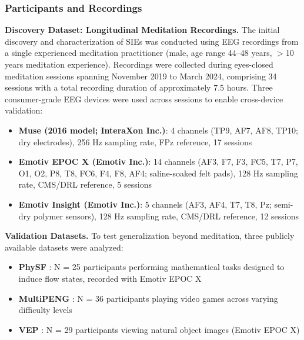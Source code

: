 \documentclass[11pt,a4paper]{article}
\begin{document}
\subsubsection{Participants and Recordings}

\textbf{Discovery Dataset: Longitudinal Meditation Recordings.}
The initial discovery and characterization of SIEs was conducted using EEG recordings from a single experienced meditation practitioner (male, age range 44--48 years, $>$10 years meditation experience). Recordings were collected during eyes-closed meditation sessions spanning November 2019 to March 2024, comprising 34 sessions with a total recording duration of approximately 7.5 hours. Three consumer-grade EEG devices were used across sessions to enable cross-device validation:

\begin{itemize}
    \item \textbf{Muse (2016 model; InteraXon Inc.)}: 4 channels (TP9, AF7, AF8, TP10; dry electrodes), 256 Hz sampling rate, FPz reference, 17 sessions
    \item \textbf{Emotiv EPOC X (Emotiv Inc.)}: 14 channels (AF3, F7, F3, FC5, T7, P7, O1, O2, P8, T8, FC6, F4, F8, AF4; saline-soaked felt pads), 128 Hz sampling rate, CMS/DRL reference, 5 sessions
    \item \textbf{Emotiv Insight (Emotiv Inc.)}: 5 channels (AF3, AF4, T7, T8, Pz; semi-dry polymer sensors), 128 Hz sampling rate, CMS/DRL reference, 12 sessions
\end{itemize}

\textbf{Validation Datasets.}
To test generalization beyond meditation, three publicly available datasets were analyzed:
\begin{itemize}
    \item \textbf{PhySF} \parencite{albuquerque2024physf}: N = 25 participants performing mathematical tasks designed to induce flow states, recorded with Emotiv EPOC X
    \item \textbf{MultiPENG} \parencite{albuquerque2023multimodal}: N = 36 participants playing video games across varying difficulty levels
    \item \textbf{VEP} \parencite{faisal2023eeg}: N = 29 participants viewing natural object images (Emotiv EPOC X)
\end{itemize}
\end{document}
